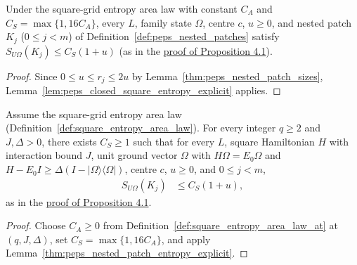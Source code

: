 \begin{lemma}
    \label{thm:peps_nested_patch_entropy_explicit}
    \leanok
    Under the square-grid entropy area law with constant $C_A$ and $C_S=\max\{1,16C_A\}$, every $L$, family state $\Omega$, centre $c$, $u\ge0$, and nested patch $K_j$ ($0\le j<m$) of Definition~\ref{def:peps_nested_patches} satisfy $S_{U\Omega}(K_j)\le C_S(1+u)$ (as in the
    \href{https://github.com/openai/math/blob/adc7f1241b42e322a6451854ab7e4b4c146bf78a/preprints/Polynomial-PEPS-approximation-of-gapped-square-grid-ground-states-September-24-2026/build/sections/03-patches.tex\#L362-L368}{proof of Proposition 4.1}).
\end{lemma}
\begin{proof}
    \leanok
    Since $0\le u\le r_j\le2u$ by Lemma~\ref{thm:peps_nested_patch_sizes}, Lemma~\ref{lem:peps_closed_square_entropy_explicit} applies.
\end{proof}

\begin{lemma}
    \label{thm:peps_nested_patch_entropy}
    \leanok
    Assume the square-grid entropy area law (Definition~\ref{def:square_entropy_area_law}). For every integer $q\ge2$ and $J,\Delta>0$, there exists $C_S\ge1$ such that for every $L$, square Hamiltonian $H$ with interaction bound $J$, unit ground vector $\Omega$ with $H\Omega=E_0\Omega$ and $H-E_0I\ge\Delta(I-|\Omega\rangle\langle\Omega|)$, centre $c$, $u\ge0$, and $0\le j<m$,
    \begin{align}
        S_{U\Omega}(K_j) & \le C_S(1+u),
        \label{eq:peps_nested_patch_entropy}
    \end{align}
    as in the
    \href{https://github.com/openai/math/blob/adc7f1241b42e322a6451854ab7e4b4c146bf78a/preprints/Polynomial-PEPS-approximation-of-gapped-square-grid-ground-states-September-24-2026/build/sections/03-patches.tex\#L362-L374}{proof of Proposition 4.1}.
\end{lemma}
\begin{proof}
    \leanok
    Choose $C_A\ge0$ from Definition~\ref{def:square_entropy_area_law_at} at $(q,J,\Delta)$, set $C_S=\max\{1,16C_A\}$, and apply Lemma~\ref{thm:peps_nested_patch_entropy_explicit}.
\end{proof}

